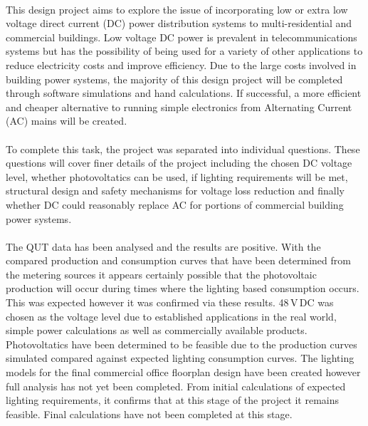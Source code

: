 \paragraph{}
This design project aims to explore the issue of incorporating low or extra low voltage direct current (DC) power distribution systems to multi-residential and commercial buildings. Low voltage DC power is prevalent in telecommunications systems but has the possibility of being used for a variety of other applications to reduce electricity costs and improve efficiency. Due to the large costs involved in building power systems, the majority of this design project will be completed through software simulations and hand calculations. If successful, a more efficient and cheaper alternative to running simple electronics from Alternating Current (AC) mains will be created. 

\paragraph{}
To complete this task, the project was separated into individual questions. These questions will cover finer details of the project including the chosen DC voltage level, whether photovoltatics can be used, if lighting requirements will be met, structural design and safety mechanisms for voltage loss reduction and finally whether DC could reasonably replace AC for portions of commercial building power systems. 

\paragraph{}
The QUT data has been analysed and the results are positive. With the compared production and consumption curves that have been determined from the metering sources it appears certainly possible that the photovoltaic production will occur during times where the lighting based consumption occurs. This was expected however it was confirmed via these results. 48\,V\,DC was chosen as the voltage level due to established applications in the real world, simple power calculations as well as commercially available products. Photovoltatics have been determined to be feasible due to the production curves simulated compared against expected lighting consumption curves. The lighting models for the final commercial office floorplan design have been created however full analysis has not yet been completed. From initial calculations of expected lighting requirements, it confirms that at this stage of the project it remains feasible. Final calculations have not been completed at this stage.    
 
\newpage
